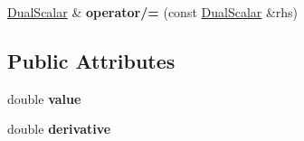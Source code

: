 \begin{DoxyCompactItemize}
\item 
\hypertarget{structautodifk_1_1forward_1_1_dual_scalar_a4460eee6e05601ff7b254d98ece3f9c6}{\hyperlink{structautodifk_1_1forward_1_1_dual_scalar}{Dual\-Scalar} \& {\bfseries operator/=} (const \hyperlink{structautodifk_1_1forward_1_1_dual_scalar}{Dual\-Scalar} \&rhs)}\label{structautodifk_1_1forward_1_1_dual_scalar_a4460eee6e05601ff7b254d98ece3f9c6}

\end{DoxyCompactItemize}
\subsection*{Public Attributes}
\begin{DoxyCompactItemize}
\item 
\hypertarget{structautodifk_1_1forward_1_1_dual_scalar_a7b05a23f4e01fd8b3ed1183539b44291}{double {\bfseries value}}\label{structautodifk_1_1forward_1_1_dual_scalar_a7b05a23f4e01fd8b3ed1183539b44291}

\item 
\hypertarget{structautodifk_1_1forward_1_1_dual_scalar_ae9baa4e80b012e4abd632c02a9e8bb01}{double {\bfseries derivative}}\label{structautodifk_1_1forward_1_1_dual_scalar_ae9baa4e80b012e4abd632c02a9e8bb01}

\end{DoxyCompactItemize}
